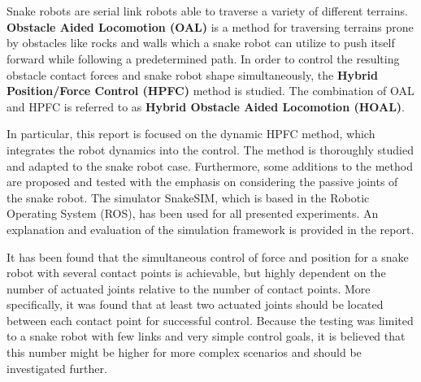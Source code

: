 \chapter{\abstractname}


Snake robots are serial link robots able to traverse a variety of different terrains. 
\textbf{Obstacle Aided Locomotion (OAL)} is a method for traversing terrains prone by obstacles like rocks and walls which a snake robot can utilize to push itself forward while following a predetermined path. In order to control the resulting obstacle contact forces and snake robot shape simultaneously, the \textbf{Hybrid Position/Force Control (HPFC)} method is studied. The combination of OAL and HPFC is referred to as \textbf{Hybrid Obstacle Aided Locomotion (HOAL)}.

In particular, this report is focused on the dynamic HPFC method, which integrates the robot dynamics into the control. The method is thoroughly studied and adapted to the snake robot case. Furthermore, some additions to the method are proposed and tested with the emphasis on considering the passive joints of the snake robot. 
The simulator SnakeSIM, which is based in the Robotic Operating System (ROS), has been used for all presented experiments. An explanation and evaluation of the simulation framework is provided in the report.

It has been found that the simultaneous control of force and position for a snake robot with several contact points is achievable, but highly dependent on the number of actuated joints relative to the number of contact points. More specifically, it was found that at least two actuated joints should be located between each contact point for successful control. Because the testing was limited to a snake robot with few links and very simple control goals, it is believed that this number might be higher for more complex scenarios and should be investigated further.




\makeatletter
{}


\makeatother








